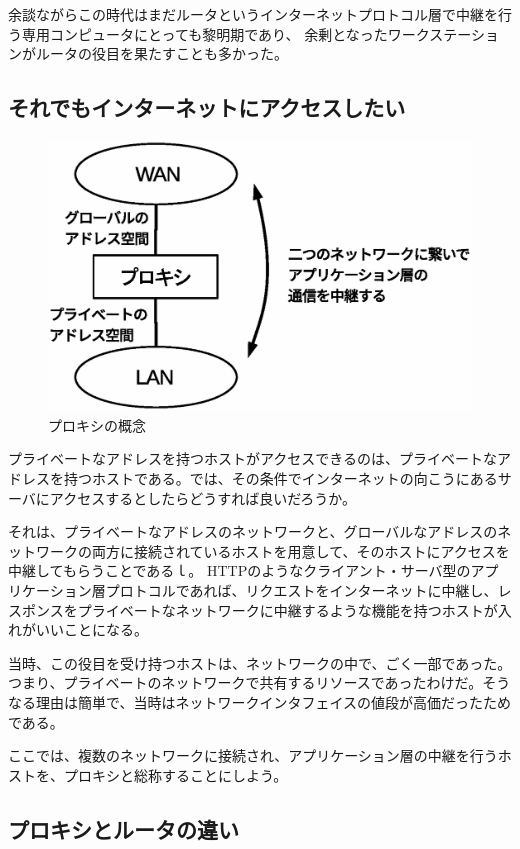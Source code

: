 余談ながらこの時代はまだルータというインターネットプロトコル層で中継を行う専用コンピュータにとっても黎明期であり、
余剰となったワークステーションがルータの役目を果たすことも多かった。

\subsection{それでもインターネットにアクセスしたい}

\begin{figure}[htbp]
	\includegraphics[width=12cm,clip]{draw/fig1.eps}
	\caption{プロキシの概念}
	\label{fig:proxy1}
\end{figure}

プライベートなアドレスを持つホストがアクセスできるのは、プライベートなアドレスを持つホストである。では、その条件でインターネットの向こうにあるサーバにアクセスするとしたらどうすれば良いだろうか。

それは、プライベートなアドレスのネットワークと、グローバルなアドレスのネットワークの両方に接続されているホストを用意して、そのホストにアクセスを中継してもらうことであるｌ。
HTTPのようなクライアント・サーバ型のアプリケーション層プロトコルであれば、リクエストをインターネットに中継し、レスポンスをプライベートなネットワークに中継するような機能を持つホストが入れがいいことになる。

当時、この役目を受け持つホストは、ネットワークの中で、ごく一部であった。つまり、プライベートのネットワークで共有するリソースであったわけだ。そうなる理由は簡単で、当時はネットワークインタフェイスの値段が高価だったためである。

ここでは、複数のネットワークに接続され、アプリケーション層の中継を行うホストを、プロキシと総称することにしよう。

\subsection{プロキシとルータの違い}

